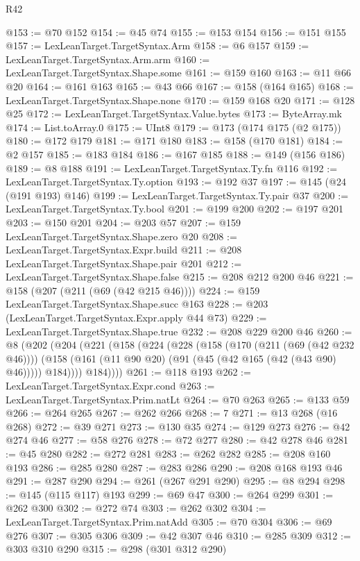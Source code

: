 \begin{lexlean}{R42}
\begin{coremodule}
@153 := @70 @152
@154 := @45 @74
@155 := @153 @154
@156 := @151 @155
@157 := LexLeanTarget.TargetSyntax.Arm
@158 := @6 @157
@159 := LexLeanTarget.TargetSyntax.Arm.arm
@160 := LexLeanTarget.TargetSyntax.Shape.some
@161 := @159 @160
@163 := @11 @66 @20
@164 := @161 @163
@165 := @43 @66
@167 := @158 (@164 @165)
@168 := LexLeanTarget.TargetSyntax.Shape.none
@170 := @159 @168 @20
@171 := @128 @25
@172 := LexLeanTarget.TargetSyntax.Value.bytes
@173 := ByteArray.mk
@174 := List.toArray.{0}
@175 := UInt8
@179 := @173 (@174 @175 (@2 @175))
@180 := @172 @179
@181 := @171 @180
@183 := @158 (@170 @181)
@184 := @2 @157
@185 := @183 @184
@186 := @167 @185
@188 := @149 (@156 @186)
@189 := @8 @188
@191 := LexLeanTarget.TargetSyntax.Ty.fn @116
@192 := LexLeanTarget.TargetSyntax.Ty.option
@193 := @192 @37
@197 := @145 (@24 (@191 @193) @146)
@199 := LexLeanTarget.TargetSyntax.Ty.pair @37
@200 := LexLeanTarget.TargetSyntax.Ty.bool
@201 := @199 @200
@202 := @197 @201
@203 := @150 @201
@204 := @203 @57
@207 := @159 LexLeanTarget.TargetSyntax.Shape.zero @20
@208 := LexLeanTarget.TargetSyntax.Expr.build
@211 := @208 LexLeanTarget.TargetSyntax.Shape.pair @201
@212 := LexLeanTarget.TargetSyntax.Shape.false
@215 := @208 @212 @200 @46
@221 := @158 (@207 (@211 (@69 (@42 @215 @46))))
@224 := @159 LexLeanTarget.TargetSyntax.Shape.succ @163
@228 := @203 (LexLeanTarget.TargetSyntax.Expr.apply @44 @73)
@229 := LexLeanTarget.TargetSyntax.Shape.true
@232 := @208 @229 @200 @46
@260 := @8
    (@202
      (@204
        (@221
          (@158
            (@224
              (@228
                (@158
                  (@170 (@211 (@69 (@42 @232 @46))))
                  (@158 (@161 (@11 @90 @20) (@91 (@45 (@42 @165 (@42 (@43 @90) @46))))) @184))))
            @184))))
@261 := @118 @193
@262 := LexLeanTarget.TargetSyntax.Expr.cond
@263 := LexLeanTarget.TargetSyntax.Prim.natLt
@264 := @70 @263
@265 := @133 @59
@266 := @264 @265
@267 := @262 @266
@268 := 7
@271 := @13 @268 (@16 @268)
@272 := @39 @271
@273 := @130 @35
@274 := @129 @273
@276 := @42 @274 @46
@277 := @58 @276
@278 := @72 @277
@280 := @42 @278 @46
@281 := @45 @280
@282 := @272 @281
@283 := @262 @282
@285 := @208 @160 @193
@286 := @285 @280
@287 := @283 @286
@290 := @208 @168 @193 @46
@291 := @287 @290
@294 := @261 (@267 @291 @290)
@295 := @8 @294
@298 := @145 (@115 @117) @193
@299 := @69 @47
@300 := @264 @299
@301 := @262 @300
@302 := @272 @74
@303 := @262 @302
@304 := LexLeanTarget.TargetSyntax.Prim.natAdd
@305 := @70 @304
@306 := @69 @276
@307 := @305 @306
@309 := @42 @307 @46
@310 := @285 @309
@312 := @303 @310 @290
@315 := @298 (@301 @312 @290)

\end{coremodule}
\end{lexlean}
